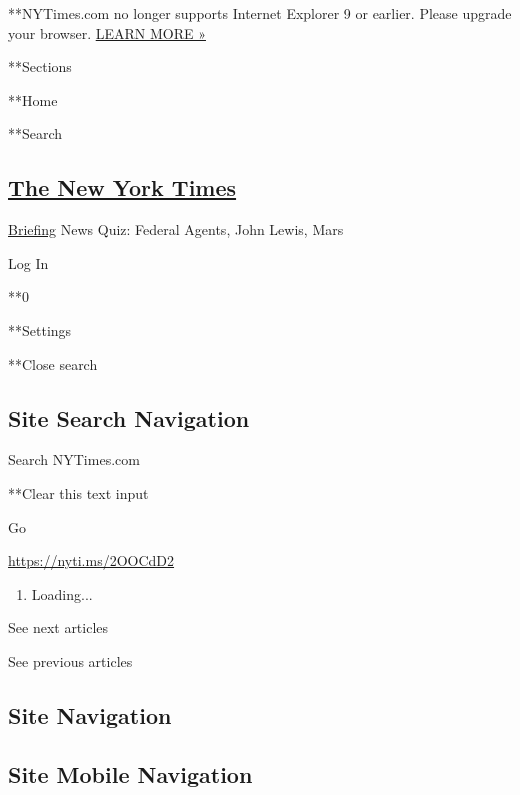  **NYTimes.com no longer supports Internet Explorer 9 or earlier. Please
upgrade your browser.
\href{http://www.nytimes.com/content/help/site/ie9-support.html}{LEARN
MORE »}

**Sections

**Home

**Search

\hypertarget{the-new-york-times}{%
\subsection{\texorpdfstring{\href{http://www.nytimes.com/}{The New York
Times}}{The New York Times}}\label{the-new-york-times}}


\href{/interactive/2018/briefing/global-morning-briefing-newsletter-signup.html}{Briefing}
\textbar{}News Quiz: Federal Agents, John Lewis, Mars

Log In

**0

**Settings

**Close search

\hypertarget{site-search-navigation}{%
\subsection{Site Search Navigation}\label{site-search-navigation}}

Search NYTimes.com

**Clear this text input

Go

\url{https://nyti.ms/2OOCdD2}

\begin{enumerate}
\def\labelenumi{\arabic{enumi}.}
\item
  Loading...
\end{enumerate}

See next articles

See previous articles

\hypertarget{site-navigation}{%
\subsection{Site Navigation}\label{site-navigation}}

\hypertarget{site-mobile-navigation}{%
\subsection{Site Mobile Navigation}\label{site-mobile-navigation}}

